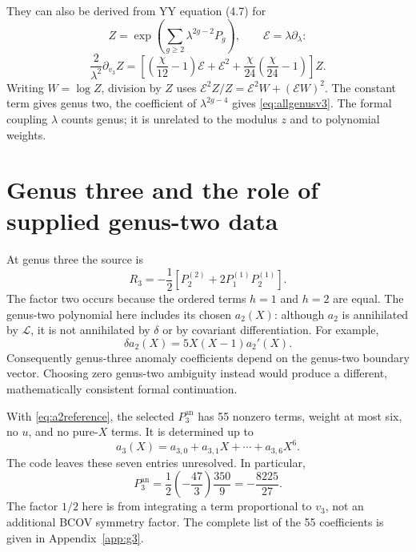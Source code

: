 \documentclass[11pt,a4paper]{article}
\numberwithin{equation}{section}
\newcommand{\del}{\partial}
\newcommand{\Pg}[2]{P_{#1}^{(#2)}}
\newcommand{\an}{\mathrm{an}}
\begin{document}
They can also be derived from YY equation (4.7) for
\begin{equation}
Z=\exp\left(\sum_{g\ge2}\lambda^{2g-2}P_g\right),\qquad
\mathcal E=\lambda\del_\lambda:
\end{equation}
\begin{equation}
\frac2{\lambda^2}\del_{v_3}Z
 =\left[\left(\frac\chi{12}-1\right)\mathcal E
         +\mathcal E^2+\frac\chi{24}\left(\frac\chi{24}-1\right)\right]Z.
\end{equation}
Writing $W=\log Z$, division by $Z$ uses
$\mathcal E^2Z/Z=\mathcal E^2W+(\mathcal EW)^2$.
The constant term gives genus two, the coefficient of $\lambda^{2g-4}$
gives \eqref{eq:allgenusv3}. The formal coupling $\lambda$ counts genus;
it is unrelated to the modulus $z$ and to polynomial weights.

\section{Genus three and the role of supplied genus-two data}

At genus three the source is
\begin{equation}
R_3=-\frac12\left[\Pg22+2\Pg11\Pg21\right].
\end{equation}
The factor two occurs because the ordered terms $h=1$ and $h=2$ are equal.
The genus-two polynomial here includes its chosen $a_2(X)$:
although $a_2$ is annihilated by $\mathscr L$, it is not annihilated by
$\delta$ or by covariant differentiation. For example,
\begin{equation}
\delta a_2(X)=5X(X-1)a_2'(X).
\end{equation}
Consequently genus-three anomaly coefficients depend on the genus-two
boundary vector. Choosing zero genus-two ambiguity instead would produce a
different, mathematically consistent formal continuation.

With \eqref{eq:a2reference}, the selected $P_3^{\an}$ has 55 nonzero terms,
weight at most six, no $u$, and no pure-$X$ terms. It is determined up to
\begin{equation}
a_3(X)=a_{3,0}+a_{3,1}X+\cdots+a_{3,6}X^6.
\end{equation}
The code leaves these seven entries unresolved. In particular,
\begin{equation}
[v_3^2]P_3^{\an}=\frac12\left(-\frac{47}{3}\right)\frac{350}{9}
 =-\frac{8225}{27}.
\end{equation}
The factor $1/2$ here is from integrating a term proportional to $v_3$,
not an additional BCOV symmetry factor.
The complete list of the 55 coefficients is given in Appendix~\ref{app:g3}.
\end{document}
